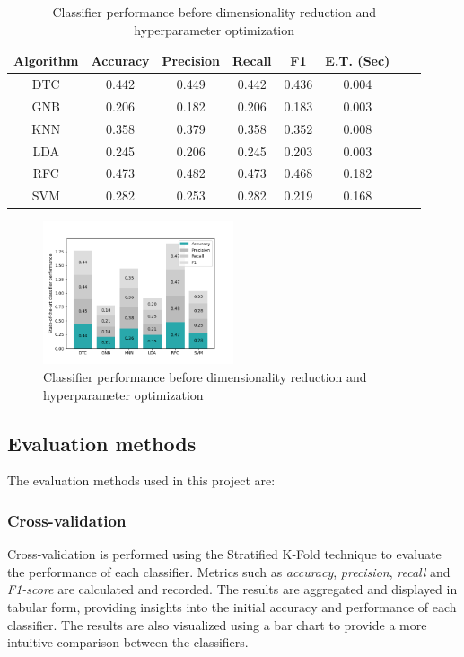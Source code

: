 	\begin{table}
		\centering
		\begin{tabular}{|c|c|c|c|c|c|c|c|}
			\hline
				\textbf{Algorithm} &\textbf{Accuracy} &\textbf{Precision} &\textbf{Recall} &\textbf{F1} &\textbf{E.T. (Sec)} \\ \hline
				\hline
				DTC   & 0.442   & 0.449   & 0.442  & 0.436 & 0.004 \\ \hline
				GNB   & 0.206   & 0.182   & 0.206  & 0.183 & 0.003 \\ \hline
				KNN   & 0.358   & 0.379   & 0.358  & 0.352 & 0.008 \\ \hline
				LDA   & 0.245   & 0.206   & 0.245  & 0.203 & 0.003 \\ \hline
				RFC   & 0.473   & 0.482   & 0.473  & 0.468 & 0.182 \\ \hline
				SVM   & 0.282   & 0.253   & 0.282  & 0.219 & 0.168 \\ 
			\hline
		\end{tabular}
		\caption{Classifier performance before dimensionality reduction and hyperparameter optimization}
		\label{tab:performance_before}
	\end{table}




	\begin{figure}[H]
		\centering
		\includegraphics[width=0.5\textwidth]{Plots/Performance_before.png}
		\caption{Classifier performance before dimensionality reduction and hyperparameter optimization}
		\label{fig:performance_before}
	\end{figure}

\subsection{Evaluation methods}
	The evaluation methods used in this project are:
	\subsubsection{Cross-validation}
		Cross-validation is performed using the Stratified K-Fold technique to evaluate the performance of each classifier. Metrics such as \emph{accuracy}, \emph{precision}, \emph{recall} and \emph{F1-score} are calculated and recorded. The results are aggregated and displayed in tabular form, providing insights into the initial accuracy and performance of each classifier. The results are also visualized using a bar chart to provide a more intuitive comparison between the classifiers. 
